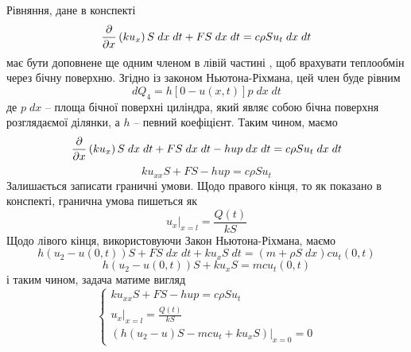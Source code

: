 \documentclass[12pt]{article} %
\newcommand{\dt}{\;dt}
\newcommand{\dx}{\;dx}
\begin{document}
Рівняння, дане в конспекті
\[\dX\mybra{k u_x}S\dx\dt+FS\dx\dt=c\rho Su_t\dx\dt\]
має бути доповнене ще одним членом в лівій частині
, щоб врахувати теплообмін через бічну поверхню. Згідно із законом Ньютона-Ріхмана, цей член буде рівним
\[dQ_4=h[0-u(x,t)]p\dx\dt\]
де $p\dx$ -- площа бічної поверхні циліндра, який являє собою бічна поверхня розглядаємої ділянки, а $h$ -- певний коефіцієнт. Таким чином, маємо
\[\dX\mybra{k u_x}S\dx\dt+FS\dx\dt-hup\dx\dt=c\rho Su_t\dx\dt\]
\[ku_{xx}S+FS-hup=c\rho Su_t\]
Залишається записати граничні умови. Щодо правого кінця, то як показано в конспекті, гранична умова пишеться як
\[u_x\big|_{x=l}=\frac{Q(t)}{kS}\]
Щодо лівого кінця, використовуючи Закон Ньютона-Ріхмана, маємо
\[h(u_2-u(0,t))S+FS\dx\dt+ku_xS\dt=(m+\rho S\dx)cu_t(0,t)\]
\[h(u_2-u(0,t))S+ku_xS=mcu_t(0,t)\]
і таким чином, задача матиме вигляд
\[\begin{cases}
ku_{xx}S+FS-hup=c\rho Su_t\\
u_x\big|_{x=l}=\frac{Q(t)}{kS}\\
(h(u_2-u)S-mcu_t+ku_xS)\big|_{x=0}=0
\end{cases}\]
\end{document}
